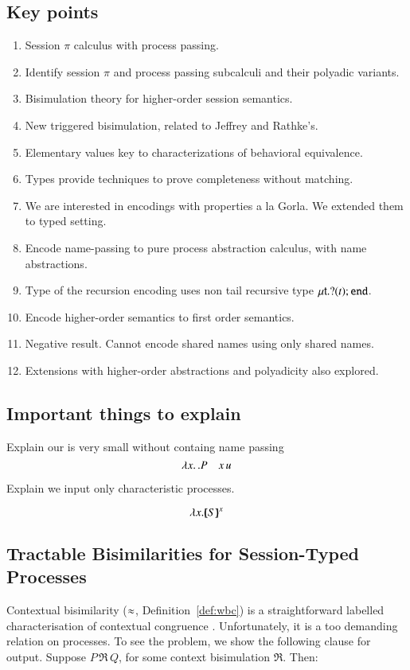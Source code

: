 \subsection{Key points}
\begin{enumerate}[1.]
	\item	Session $\pi$ calculus with process passing.
	\item	Identify session $\pi$ and process passing subcalculi and their polyadic variants.
	\item	Bisimulation theory for higher-order session semantics.
	\item	New triggered bisimulation, related to Jeffrey and Rathke's.
	\item   Elementary values key to characterizations of behavioral equivalence.
	\item	Types provide techniques to prove completeness without matching.
	\item	We are interested in encodings with properties a la Gorla. 
                We extended them to typed setting. 
	\item	Encode name-passing to pure process abstraction calculus, with name abstractions.
	\item	Type of the recursion encoding uses non tail recursive type $\mu\mathsf{t}.? (t) ; \mathtt{end}$.
	\item	Encode higher-order semantics to first order semantics.
	\item	Negative result. Cannot encode shared names using only shared names.
	\item   Extensions with higher-order abstractions and polyadicity also explored.
\end{enumerate}

\smallskip 

\subsection{Important things to explain}
Explain our \HO is very small without containg name passing 
\[ 
\lambda x.\,.P \quad x\, {u}
\]

Explain we input only characteristic processes.  

\[
\lambda x.[\!\!(S)\!\!]^{x}
\]

\subsection{Tractable Bisimilarities for Session-Typed Processes}
\label{subsec:intro:bisimulation}
\noi 
{}
Contextual bisimilarity ($\approx$, Definition~\ref{def:wbc}) is 
a straightforward labelled characterisation of contextual congruence 
\cite{SaWabook}. 
Unfortunately, it is a too demanding relation on processes. 
To see the problem, we show 
the following clause for output.
Suppose $P \,\Re\, Q$, for some context bisimulation $\Re$. Then:


